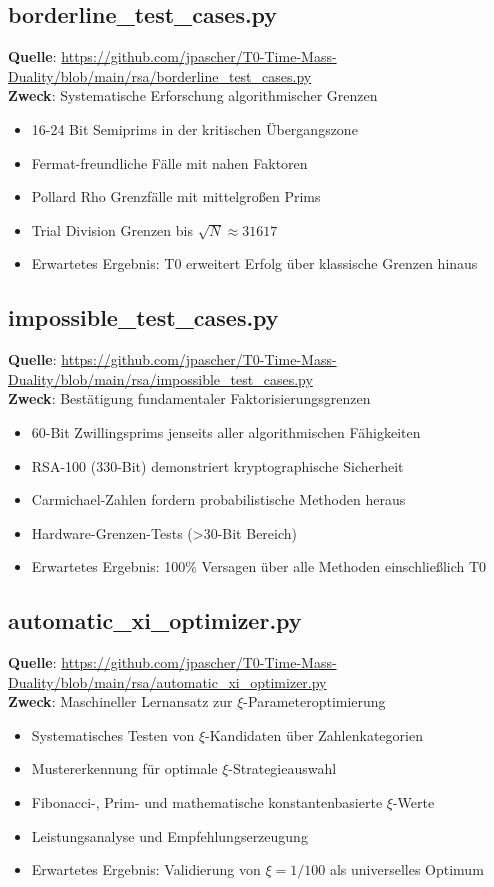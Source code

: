 \documentclass[12pt,a4paper]{article}
\begin{document}
	\subsection{borderline\_test\_cases.py}
	\textbf{Quelle}: \url{https://github.com/jpascher/T0-Time-Mass-Duality/blob/main/rsa/borderline_test_cases.py}\\
	\textbf{Zweck}: Systematische Erforschung algorithmischer Grenzen
	\begin{itemize}
		\item 16-24 Bit Semiprims in der kritischen Übergangszone
		\item Fermat-freundliche Fälle mit nahen Faktoren
		\item Pollard Rho Grenzfälle mit mittelgroßen Prims
		\item Trial Division Grenzen bis $\sqrt{N} \approx 31617$
		\item Erwartetes Ergebnis: T0 erweitert Erfolg über klassische Grenzen hinaus
	\end{itemize}
	
	\subsection{impossible\_test\_cases.py}
	\textbf{Quelle}: \url{https://github.com/jpascher/T0-Time-Mass-Duality/blob/main/rsa/impossible_test_cases.py}\\
	\textbf{Zweck}: Bestätigung fundamentaler Faktorisierungsgrenzen
	\begin{itemize}
		\item 60-Bit Zwillingsprims jenseits aller algorithmischen Fähigkeiten
		\item RSA-100 (330-Bit) demonstriert kryptographische Sicherheit
		\item Carmichael-Zahlen fordern probabilistische Methoden heraus
		\item Hardware-Grenzen-Tests (>30-Bit Bereich)
		\item Erwartetes Ergebnis: 100\% Versagen über alle Methoden einschließlich T0
	\end{itemize}
	
	\subsection{automatic\_xi\_optimizer.py}
	\textbf{Quelle}: \url{https://github.com/jpascher/T0-Time-Mass-Duality/blob/main/rsa/automatic_xi_optimizer.py}\\
	\textbf{Zweck}: Maschineller Lernansatz zur $\xi$-Parameteroptimierung
	\begin{itemize}
		\item Systematisches Testen von $\xi$-Kandidaten über Zahlenkategorien
		\item Mustererkennung für optimale $\xi$-Strategieauswahl
		\item Fibonacci-, Prim- und mathematische konstantenbasierte $\xi$-Werte
		\item Leistungsanalyse und Empfehlungserzeugung
		\item Erwartetes Ergebnis: Validierung von $\xi = 1/100$ als universelles Optimum
	\end{itemize}
	
\end{document}
